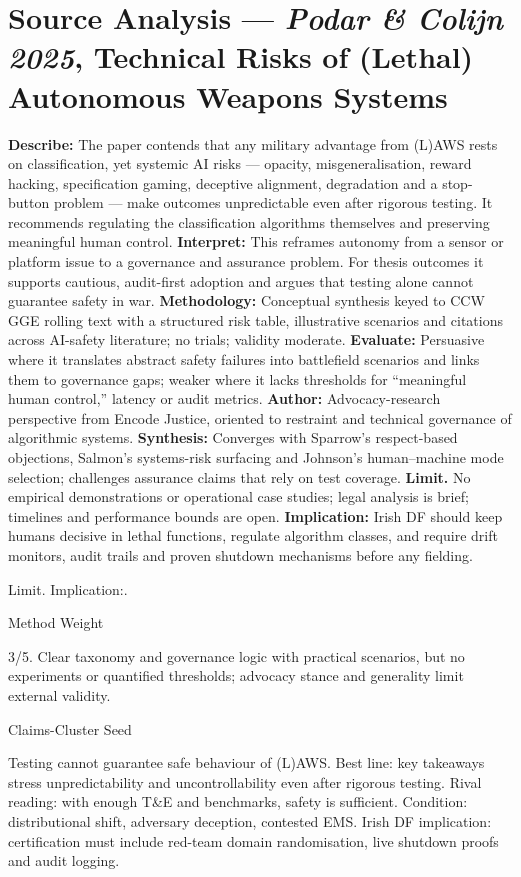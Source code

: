 \section*{Source Analysis — \textit{Podar & Colijn 2025}, Technical Risks of (Lethal) Autonomous Weapons Systems}
\textbf{Describe:} The paper contends that any military advantage from (L)AWS rests on classification, yet systemic AI risks — opacity, misgeneralisation, reward hacking, specification gaming, deceptive alignment, degradation and a stop-button problem — make outcomes unpredictable even after rigorous testing. It recommends regulating the classification algorithms themselves and preserving meaningful human control.
\textbf{Interpret:} This reframes autonomy from a sensor or platform issue to a governance and assurance problem. For thesis outcomes it supports cautious, audit-first adoption and argues that testing alone cannot guarantee safety in war.
\textbf{Methodology:} Conceptual synthesis keyed to CCW GGE rolling text with a structured risk table, illustrative scenarios and citations across AI-safety literature; no trials; validity moderate.
\textbf{Evaluate:} Persuasive where it translates abstract safety failures into battlefield scenarios and links them to governance gaps; weaker where it lacks thresholds for “meaningful human control,” latency or audit metrics.
\textbf{Author:} Advocacy-research perspective from Encode Justice, oriented to restraint and technical governance of algorithmic systems.
\textbf{Synthesis:} Converges with Sparrow’s respect-based objections, Salmon’s systems-risk surfacing and Johnson’s human–machine mode selection; challenges assurance claims that rely on test coverage.
\textbf{Limit.} No empirical demonstrations or operational case studies; legal analysis is brief; timelines and performance bounds are open.
\textbf{Implication:} Irish DF should keep humans decisive in lethal functions, regulate algorithm classes, and require drift monitors, audit trails and proven shutdown mechanisms before any fielding.

Limit. Implication:.

Method Weight

3/5. Clear taxonomy and governance logic with practical scenarios, but no experiments or quantified thresholds; advocacy stance and generality limit external validity.

Claims-Cluster Seed

Testing cannot guarantee safe behaviour of (L)AWS.
Best line: key takeaways stress unpredictability and uncontrollability even after rigorous testing.
Rival reading: with enough T&E and benchmarks, safety is sufficient.
Condition: distributional shift, adversary deception, contested EMS.
Irish DF implication: certification must include red-team domain randomisation, live shutdown proofs and audit logging.

